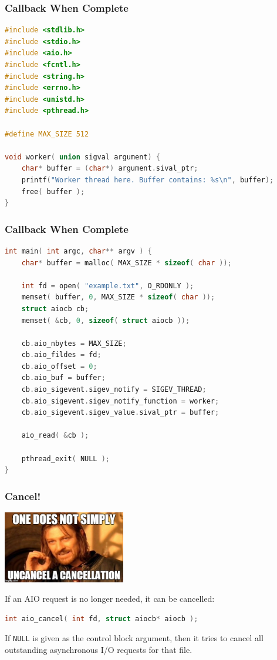 \begin{frame}[fragile]
	\frametitle{Callback When Complete}

	\begin{lstlisting}[language=C]
#include <stdlib.h>
#include <stdio.h>
#include <aio.h>
#include <fcntl.h>
#include <string.h>
#include <errno.h>
#include <unistd.h>
#include <pthread.h>

#define MAX_SIZE 512

void worker( union sigval argument) {
    char* buffer = (char*) argument.sival_ptr;
    printf("Worker thread here. Buffer contains: %s\n", buffer);
    free( buffer );
}
\end{lstlisting}

\end{frame}


\begin{frame}[fragile]
	\frametitle{Callback When Complete}
	\begin{lstlisting}[language=C]
int main( int argc, char** argv ) {
    char* buffer = malloc( MAX_SIZE * sizeof( char ));

    int fd = open( "example.txt", O_RDONLY );
    memset( buffer, 0, MAX_SIZE * sizeof( char ));
    struct aiocb cb;
    memset( &cb, 0, sizeof( struct aiocb ));

    cb.aio_nbytes = MAX_SIZE;
    cb.aio_fildes = fd;
    cb.aio_offset = 0;
    cb.aio_buf = buffer;
    cb.aio_sigevent.sigev_notify = SIGEV_THREAD;
    cb.aio_sigevent.sigev_notify_function = worker;
    cb.aio_sigevent.sigev_value.sival_ptr = buffer;

    aio_read( &cb );
    
    pthread_exit( NULL );
}
\end{lstlisting}

\end{frame}


\begin{frame}[fragile]
	\frametitle{Cancel!}

	\begin{center}
		\includegraphics[width=0.4\textwidth]{images/cancellation.jpg}
	\end{center}
	If an AIO request is no longer needed, it can be cancelled:
	\begin{lstlisting}[language=C]
int aio_cancel( int fd, struct aiocb* aiocb );
\end{lstlisting}

	If \texttt{NULL} is given as the control block argument, then it tries to cancel all outstanding asynchronous I/O requests for that file.

\end{frame}


